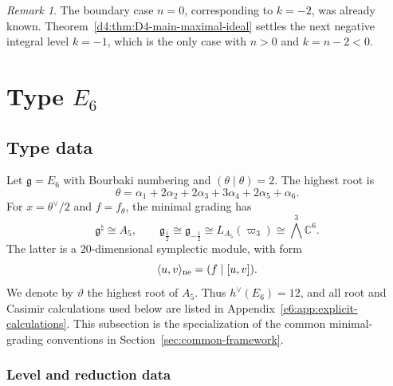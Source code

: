 \documentclass[11pt,reqno]{amsart}
\theoremstyle{definition}
\theoremstyle{remark}
\newtheorem{remark}[theorem]{Remark}
\begin{document}
\begin{remark}

The boundary case \(n=0\), corresponding to \(k=-2\), was already
known.  Theorem~\ref{d4:thm:D4-main-maximal-ideal} settles the next
negative integral level \(k=-1\), which is the only case with
\(n>0\) and \(k=n-2<0\).
\end{remark}
\section{Type \texorpdfstring{$E_6$}{E6}}
\label{sec:case-e6}

\subsection{Type data}\label{e6:sec:preliminaries}

Let $\mathfrak g=E_6$ with Bourbaki numbering and $(\theta\mid\theta)=2$.
The highest root is
\begin{equation}
 \theta=\alpha_1+2\alpha_2+2\alpha_3+3\alpha_4+2\alpha_5+\alpha_6.
 \label{e6:eq:E6-highest-root}
\end{equation}
For $x=\theta^\vee/2$ and $f=f_\theta$, the minimal grading has
\begin{equation*}
 \mathfrak g^\natural\cong A_5,
 \qquad
 \mathfrak g_{\frac12}\cong\mathfrak g_{-\frac12}
 \cong L_{A_5}(\varpi_3)\cong\bigwedge^3\mathbb C^6.
\end{equation*}
The latter is a $20$-dimensional symplectic module, with form
\begin{equation*}
 \langle u,v\rangle_{\rm ne}=(f\mid[u,v]).
\end{equation*}
We denote by $\vartheta$ the highest root of $A_5$.  Thus
$h^\vee(E_6)=12$, and all root and Casimir calculations used below are
listed in Appendix~\ref{e6:app:explicit-calculations}.  This subsection
is the specialization of the common minimal-grading conventions in
Section~\ref{sec:common-framework}.
\label{e6:subsec:E6-minimal-grading}

\subsubsection{Level and reduction data}
\end{document}
